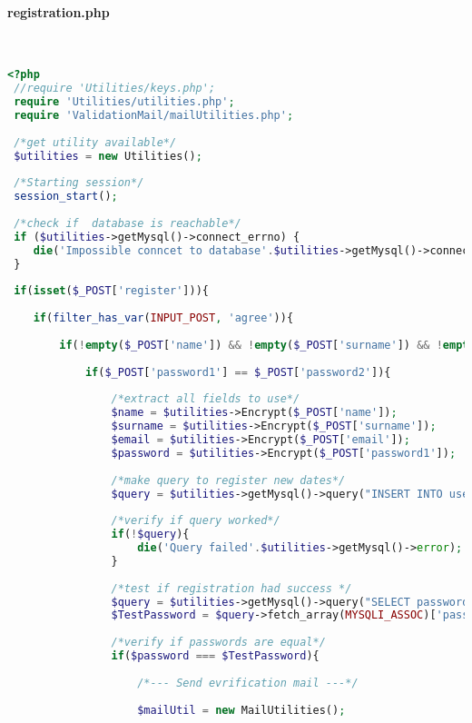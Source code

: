  \paragraph{registration.php}\leavevmode\\
 
 \begin{lstlisting}[language=php]
 <?php
 //require 'Utilities/keys.php';
 require 'Utilities/utilities.php';
 require 'ValidationMail/mailUtilities.php';
 
 /*get utility available*/
 $utilities = new Utilities();
 
 /*Starting session*/
 session_start();
 
 /*check if  database is reachable*/
 if ($utilities->getMysql()->connect_errno) {
 	die('Impossible conncet to database'.$utilities->getMysql()->connect_error);
 }
 
 if(isset($_POST['register'])){
 	
 	if(filter_has_var(INPUT_POST, 'agree')){
 		
 		if(!empty($_POST['name']) && !empty($_POST['surname']) && !empty($_POST['email']) && !empty($_POST['password1']) && !empty($_POST['password2'])){
 			
 			if($_POST['password1'] == $_POST['password2']){
 				
 				/*extract all fields to use*/
 				$name = $utilities->Encrypt($_POST['name']);
 				$surname = $utilities->Encrypt($_POST['surname']);
 				$email = $utilities->Encrypt($_POST['email']);
 				$password = $utilities->Encrypt($_POST['password1']);
 				
 				/*make query to register new dates*/
 				$query = $utilities->getMysql()->query("INSERT INTO user_table1 (name, surname, email, password) VALUES ('{$name}', '{$surname}', '{$email}', '{$password}')");
 				
 				/*verify if query worked*/
 				if(!$query){
 					die('Query failed'.$utilities->getMysql()->error);
 				}
 				
 				/*test if registration had success */
 				$query = $utilities->getMysql()->query("SELECT password FROM user_table1 WHERE (email = '{$email}')");
 				$TestPassword = $query->fetch_array(MYSQLI_ASSOC)['password'];
 				
 				/*verify if passwords are equal*/
 				if($password === $TestPassword){
 					
 					/*--- Send evrification mail ---*/
 					
 					$mailUtil = new MailUtilities();
 					

\end{lstlisting}
